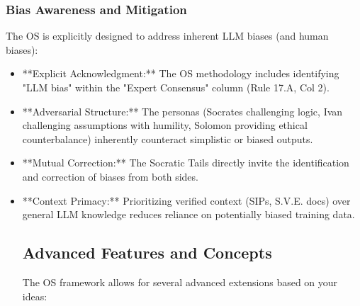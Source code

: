 \documentclass[11pt,a4paper]{article}
\theoremstyle{definition}
\theoremstyle{remark}
\begin{document}
\subsubsection{Bias Awareness and Mitigation}
The OS is explicitly designed to address inherent LLM biases (and human biases):
\begin{itemize}
    \item **Explicit Acknowledgment:** The OS methodology includes identifying "LLM bias" within the "Expert Consensus" column (Rule 17.A, Col 2).
    \item **Adversarial Structure:** The personas (Socrates challenging logic, Ivan challenging assumptions with humility, Solomon providing ethical counterbalance) inherently counteract simplistic or biased outputs.
    \item **Mutual Correction:** The Socratic Tails directly invite the identification and correction of biases from both sides.
    \item **Context Primacy:** Prioritizing verified context (SIPs, S.V.E. docs) over general LLM knowledge reduces reliance on potentially biased training data.

\subsection{Advanced Features and Concepts}

The OS framework allows for several advanced extensions based on your ideas:


\end{itemize}
\end{document}
